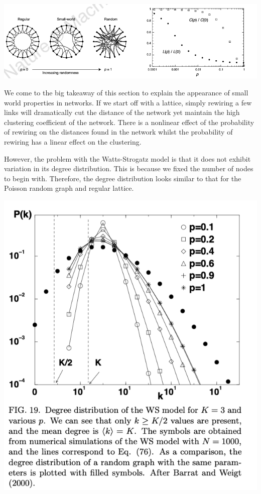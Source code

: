 \documentclass[twoside]{article}
\begin{document}
\begin{center}
\includegraphics[scale=0.6]{Small-world}
\end{center}

We come to the big takeaway of this section to explain the appearance of small world properties in networks. If we start off with a lattice, simply rewiring a few links will dramatically cut the distance of the network yet maintain the high clustering coefficient of the network. There is a nonlinear effect of the probability of rewiring on the distances found in the network whilst the probability of rewiring has a linear effect on the clustering.

However, the problem with the Watts-Strogatz model is that it does not exhibit variation in its degree distribution. This is because we fixed the number of nodes to begin with. Therefore, the degree distribution looks similar to that for the Poisson random graph and regular lattice.

\begin{center}
\includegraphics[scale=0.7]{Watts-Strogatz}
\end{center}
\end{document}

